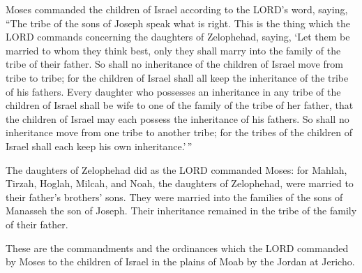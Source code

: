  Moses commanded the children of Israel according to the
LORD's word, saying, ``The tribe of the sons of Joseph speak what is
right.  This is the thing which the LORD commands concerning
the daughters of Zelophehad, saying, `Let them be married to whom they
think best, only they shall marry into the family of the tribe of their
father.  So shall no inheritance of the children of Israel
move from tribe to tribe; for the children of Israel shall all keep the
inheritance of the tribe of his fathers.  Every daughter who
possesses an inheritance in any tribe of the children of Israel shall be
wife to one of the family of the tribe of her father, that the children
of Israel may each possess the inheritance of his fathers. 
So shall no inheritance move from one tribe to another tribe; for the
tribes of the children of Israel shall each keep his own
inheritance.'\,''

 The daughters of Zelophehad did as the LORD commanded
Moses:  for Mahlah, Tirzah, Hoglah, Milcah, and Noah, the
daughters of Zelophehad, were married to their father's brothers' sons.
 They were married into the families of the sons of
Manasseh the son of Joseph. Their inheritance remained in the tribe of
the family of their father.

 These are the commandments and the ordinances which the
LORD commanded by Moses to the children of Israel in the plains of Moab
by the Jordan at Jericho.
